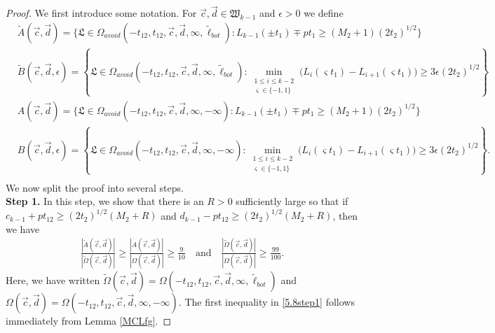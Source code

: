 \begin{proof} We first introduce some notation. For $\vec{c}, \vec{d} \in \mathfrak{W}_{k-1}$ and $\epsilon > 0$ we define
	\begin{equation}
	\begin{split}
	&\tilde A(\vec{c}, \vec{d}) = \{\mathfrak{L} \in \Omega_{avoid}(-t_{12}, t_{12}, \vec{c}, \vec{d}, \infty, \tilde{\ell}_{bot}): L_{k-1}(\pm t_{1}) \mp pt_1 \geq (M_2 + 1) (2t_2)^{1/2} \} \\
	&\tilde B(\vec{c}, \vec{d}, \epsilon) = \left\{ \mathfrak{L} \in \Omega_{avoid}(-t_{12}, t_{12}, \vec{c}, \vec{d}, \infty, \tilde{\ell}_{bot}): \min_{\substack {1\leq i\leq k-2 \\ \varsigma \in \{-1, 1\}} } \big(L_{i}(\varsigma t_1) - L_{i+1}(\varsigma t_1)\big) \geq 3\epsilon (2t_2)^{1/2} \right\} \\
	&A(\vec{c}, \vec{d}) = \{ \mathfrak{L} \in \Omega_{avoid}(-t_{12}, t_{12}, \vec{c}, \vec{d}, \infty, -\infty): L_{k-1}(\pm t_{1}) \mp pt_1 \geq (M_2 + 1) (2t_2)^{1/2} \} \\
	&B(\vec{c}, \vec{d}, \epsilon) = \left\{ \mathfrak{L} \in \Omega_{avoid}(-t_{12}, t_{12}, \vec{c}, \vec{d}, \infty, -\infty): \min_{\substack {1\leq i\leq k-2 \\ \varsigma \in \{-1, 1\}} } \big(L_{i}(\varsigma t_1) - L_{i+1}(\varsigma t_1)\big) \geq 3\epsilon (2t_2)^{1/2} \right\}. \\
	\end{split}
	\end{equation}
	We now split the proof into several steps.\\
	
	{\bf \raggedleft Step 1.} In this step, we show that there is an $R > 0$ sufficiently large so that if $c_{k-1} + pt_{12} \geq (2t_2)^{1/2} (M_2 + R)$ and $d_{k-1} - pt_{12} \geq (2t_2)^{1/2} (M_2 + R)$, then we have 
	\begin{equation}\label{5.8step1}
	\begin{split}
	\frac{|\tilde A(\vec{c}, \vec{d})|}{|\tilde{\Omega}(\vec{c}, \vec{d})|} \geq \frac{| A(\vec{c}, \vec{d})|}{|{\Omega}(\vec{c}, \vec{d})|} \geq  \frac{9}{10} \quad \mathrm{and} \quad \frac{|\tilde{\Omega}(\vec{c}, \vec{d})|}{|{\Omega}(\vec{c}, \vec{d})|} \geq \frac{99}{100}.
	\end{split}
	\end{equation} 
	Here, we have written $\tilde{\Omega}(\vec{c}, \vec{d})  = {\Omega}(-t_{12}, t_{12}, \vec{c}, \vec{d}, \infty, \tilde{\ell}_{bot})$ and $\Omega(\vec{c}, \vec{d}) = {\Omega}(-t_{12}, t_{12}, \vec{c}, \vec{d}, \infty, -\infty)$. The first inequality in \eqref{5.8step1} follows immediately from Lemma \ref{MCLfg}. 
	

\end{proof}
